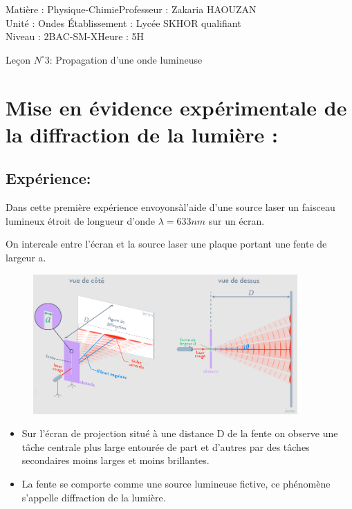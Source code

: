 \documentclass[12pt]{article}
\author{Zakaria HAOUZAN}
\date{\today}
\newcommand\headerMe[2]{\noindent{}#1\hfill#2}
\begin{document}
\headerMe{Matière : Physique-Chimie}{Professeur : Zakaria HAOUZAN}\\
\headerMe{Unité : Ondes }{Établissement : Lycée SKHOR qualifiant}\\
\headerMe{Niveau : 2BAC-SM-X}{Heure : 5H}\\

\begin{center}

    \Large{Leçon $N^{\circ} 3 $: \color{red}Propagation d'une onde lumineuse }
\end{center}
\section{Mise en évidence expérimentale de la diffraction de la lumière : }

\subsection{Expérience: }

Dans cette première expérience envoyonsàl'aide d'une source laser un faisceau lumineux étroit de longueur d'onde $\lambda = 633nm$ sur un écran.

On intercale entre l'écran et la source laser une plaque portant une fente de largeur a.
\begin{figure}[h]

	\begin{center}
		\includegraphics[width=0.9\textwidth]{./img/OLexperience.png}
	\end{center}
	\vspace{-1.5cm}
\end{figure}

\begin{itemize}
	\item Sur l'écran de projection situé à une distance D de la fente on observe une tâche centrale plus large entourée de part et
d'autres par des tâches secondaires moins larges et moins brillantes.

\item La fente se comporte comme une source lumineuse fictive, ce phénomène s'appelle diffraction de la lumière.
\end{itemize}
\end{document}
